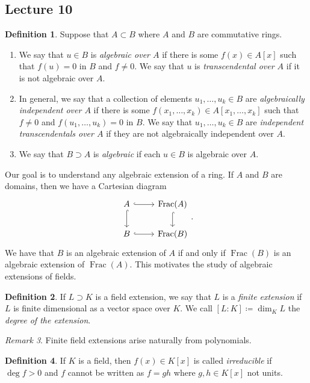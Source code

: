 \documentclass[10pt,letterpaper,cm]{nupset}
\theoremstyle{definition}
\newtheorem{definition}{Definition}[subsection]
\theoremstyle{theorem}
\theoremstyle{remark}
\newtheorem{remark}[definition]{Remark}
\newcommand{\1}{\mathbf{1}}
\newcommand{\0}{\vec 0}
\DeclareMathOperator{\Frac}{Frac}
\begin{document}
\subsection{Lecture 10}

\begin{definition} Suppose that $A \subset B$ where $A$ and $B$ are commutative rings. 
\begin{enumerate}
\item We say that $u \in B$ is \textit{algebraic over $A$} if there is some $f(x) \in A[x]$ such that $f(u) =0$ in $B$ and $f\ne 0$. We say that $u$ is \textit{transcendental over $A$} if it is not algebraic over $A$. 
\item In general, we say that a collection of elements $u_1, \ldots, u_k \in B$ are \textit{algebraically independent over $A$} if there is some $f(x_1, \ldots, x_k) \in A[x_1, \ldots, x_k]$ such that $f\ne 0$ and $f(u_1, \ldots, u_k) =0$ in $B$. We say that $u_1, \ldots, u_k \in B$ are \textit{independent transcendentals over $A$} if they are not algebraically independent over $A$.
\item We say that $B \supset A$ is \textit{algebraic} if each $u\in B$ is algebraic over $A$.
\end{enumerate}
\end{definition} 


Our goal is to understand any algebraic extension of a ring. If $A$ and $B$ are domains, then we have a Cartesian diagram 
\[
\begin{tikzcd}
A \arrow[r, hook] \arrow[d, hook] & \Frac(A) \arrow[d, hook] \\
B \arrow[r, hook]                 & \Frac(B)                
\end{tikzcd}
.\] We have that $B$ is an algebraic extension of $A$ if and only if $\Frac(B)$ is an algebraic extension of $\Frac(A)$. This motivates the study of algebraic extensions of fields. 


\begin{definition}
If $L \supset K$ is a field extension, we say that $L$ is a \textit{finite extension} if $L$ is finite dimensional as a vector space over $K$. We call $[L: K]\coloneqq  \dim_K{L}$ the \textit{degree of the extension}.
\end{definition}

\begin{remark}
Finite field extensions arise naturally from polynomials. 
\end{remark}

\begin{definition}
If $K$ is a field, then $f(x) \in K[x]$ is called \textit{irreducible} if $\deg{f}>0$ and $f$ cannot be written as $f=gh$ where $g,h\in K[x]$ not units. 
\end{definition}
\end{document}
